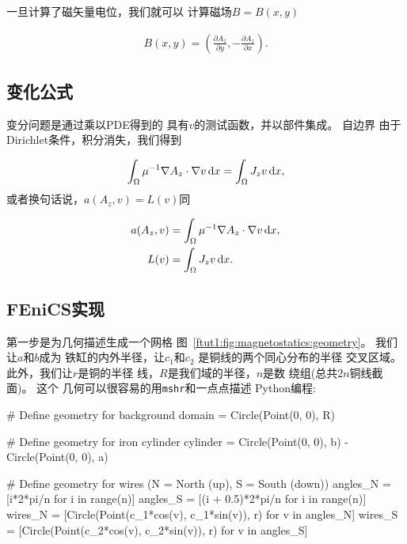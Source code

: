 
一旦计算了磁矢量电位，我们就可以
计算磁场$B = B(x,y)$

\begin{align}
  B(x, y) =
  \left(\frac{\partial A_z}{\partial y},
       -\frac{\partial A_z}{\partial x}\right).
\end{align}

\subsection{变化公式}

变分问题是通过乘以PDE得到的
具有$v$的测试函数，并以部件集成。 自边界
由于Dirichlet条件，积分消失，我们得到

\begin{equation}
  \int_{\Omega} \mu^{-1} \nabla A_z \cdot \nabla v \dx
  = \int_{\Omega} J_z v \dx,
\end{equation}
或者换句话说，$a(A_z,v) = L(v)$同

\begin{align}
  a(A_z, v) &= \int_{\Omega} \mu^{-1} \nabla A_z \cdot \nabla v \dx, \\
  L(v) &= \int_{\Omega} J_z v \dx.
\end{align}

\subsection{FEniCS实现}

第一步是为几何描述生成一个网格
图~\ref{ftut1:fig:magnetostatics:geometry}。 我们让$a$和$b$成为
铁缸的内外半径，让$c_1$和$c_2$
是铜线的两个同心分布的半径
交叉区域。 此外，我们让$r$是铜的半径
线，$R$是我们域的半径，$n$是数
绕组(总共$2n$铜线截面)。 这个
几何可以很容易的用\texttt{mshr}和一点点描述
Python编程:


\begin{python}
# Define geometry for background
domain = Circle(Point(0, 0), R)

# Define geometry for iron cylinder
cylinder = Circle(Point(0, 0), b) - Circle(Point(0, 0), a)

# Define geometry for wires (N = North (up), S = South (down))
angles_N = [i*2*pi/n for i in range(n)]
angles_S = [(i + 0.5)*2*pi/n for i in range(n)]
wires_N = [Circle(Point(c_1*cos(v), c_1*sin(v)), r) for v in angles_N]
wires_S = [Circle(Point(c_2*cos(v), c_2*sin(v)), r) for v in angles_S]
\end{python}

